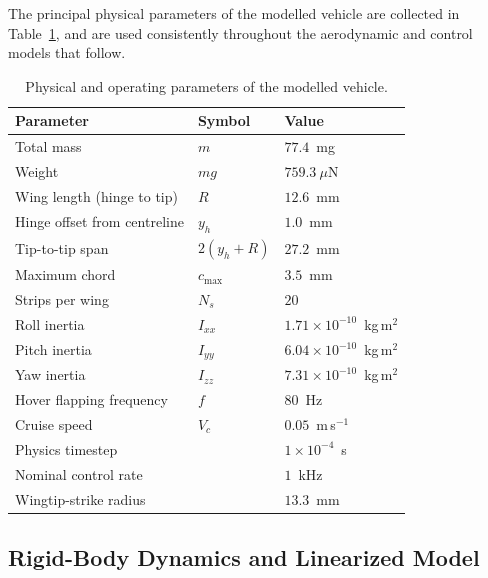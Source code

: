 \documentclass[final,5p,times]{elsarticle}
\begin{document}
The principal physical parameters of the modelled vehicle are collected in Table~\ref{tab:vehicle}, and are used consistently throughout the aerodynamic and control models that follow.

\begin{table}[t]
\centering
\caption{Physical and operating parameters of the modelled vehicle.}
\label{tab:vehicle}
\footnotesize\setlength{\tabcolsep}{3pt}
\begin{tabular*}{\columnwidth}{@{\extracolsep{\fill}}lll@{}}
\toprule
Parameter & Symbol & Value \\
\midrule
Total mass & $m$ & $77.4$~mg \\
Weight & $mg$ & $759.3~\mu$N \\
Wing length (hinge to tip) & $R$ & $12.6$~mm \\
Hinge offset from centreline & $y_h$ & $1.0$~mm \\
Tip-to-tip span & $2(y_h + R)$ & $27.2$~mm \\
Maximum chord & $c_{\max}$ & $3.5$~mm \\
Strips per wing & $N_s$ & $20$ \\
Roll inertia & $I_{xx}$ & $1.71\times10^{-10}$~kg\,m$^2$ \\
Pitch inertia & $I_{yy}$ & $6.04\times10^{-10}$~kg\,m$^2$ \\
Yaw inertia & $I_{zz}$ & $7.31\times10^{-10}$~kg\,m$^2$ \\
Hover flapping frequency & $f$ & $80$~Hz \\
Cruise speed & $V_c$ & $0.05$~m\,s$^{-1}$ \\
Physics timestep & & $1\times10^{-4}$~s \\
Nominal control rate & & $1$~kHz \\
Wingtip-strike radius & & $13.3$~mm \\
\bottomrule
\end{tabular*}
\end{table}

\subsection{Rigid-Body Dynamics and Linearized Model}
\label{sec:method_dynamics}
\end{document}
